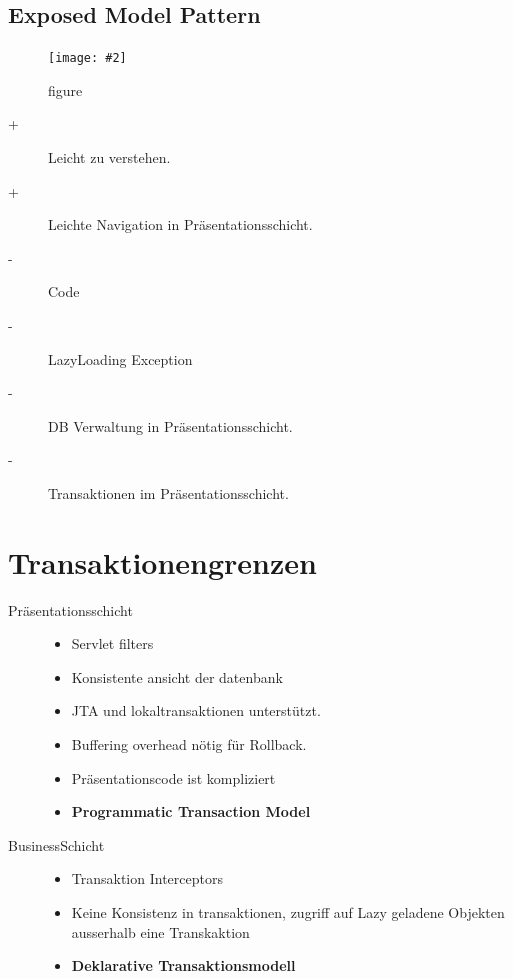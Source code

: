\documentclass[a4paper,10pt]{scrreprt}
\newcommand{\pic}[2][figure]{\begin{figure}[h]
 \centering
 \texttt{[image: \#2]}
 \caption{#1}
\end{figure}
}
\begin{document}
\subsection{Exposed Model Pattern}
\pic{exmp.png}
\begin{description}
 \item [+] Leicht zu verstehen.
 \item [+] Leichte Navigation in Präsentationsschicht.
 \item [-] Code
 \item [-] LazyLoading Exception
 \item [-] DB Verwaltung in Präsentationsschicht.
 \item [-] Transaktionen im Präsentationsschicht.
\end{description}

\section{Transaktionengrenzen}
\begin{description}
 \item [Präsentationsschicht] \begin{itemize}
                               \item Servlet filters
                               \item Konsistente ansicht der datenbank
                               \item JTA und lokaltransaktionen unterstützt.
                               \item Buffering overhead nötig für Rollback.
                               \item Präsentationscode ist kompliziert 
                               \item \textbf{Programmatic Transaction Model}
                              \end{itemize}
\item [BusinessSchicht] \begin{itemize}
                         \item Transaktion Interceptors
                          \item Keine Konsistenz in transaktionen, zugriff auf Lazy geladene Objekten ausserhalb eine 
Transkaktion
\item \textbf{Deklarative Transaktionsmodell}
                        \end{itemize}


\end{description}
\end{document}
